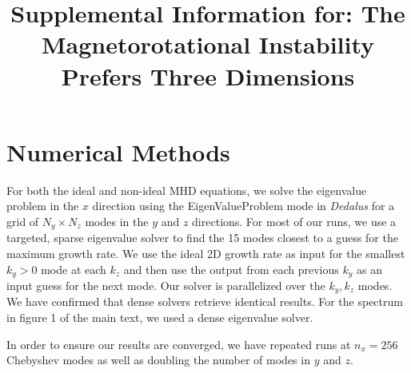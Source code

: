 \documentclass[aps,prl,preprint
,superscriptaddress]{revtex4-1}
\begin{document}

\title{Supplemental Information for: The Magnetorotational Instability Prefers Three Dimensions}

\section{Numerical Methods}
\label{sec:methods}

For both the ideal and non-ideal MHD equations, we solve the eigenvalue problem in the $x$ direction using the EigenValueProblem mode in \emph{Dedalus} for a grid of $N_y \times N_z$ modes in the $y$ and $z$ directions.
For most of our runs, we use a targeted, sparse eigenvalue solver to find the 15 modes closest to a guess for the maximum growth rate.
We use the ideal 2D growth rate as input for the smallest $k_y > 0$ mode at each $k_z$ and then use the output from each previous $k_y$ as an input guess for the next mode.
Our solver is parallelized over the $k_y, k_z$ modes.
We have confirmed that dense solvers retrieve identical results.
For the spectrum in figure 1 of the main text, we used a dense eigenvalue solver.

In order to ensure our results are converged, we have repeated runs at $n_x=256$ Chebyshev modes as well as doubling the number of modes in $y$ and $z$.
\end{document}
